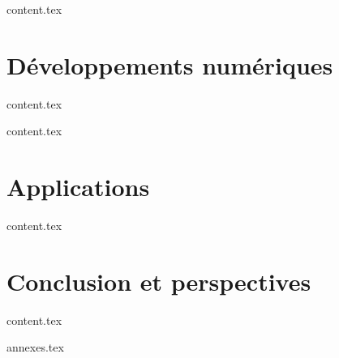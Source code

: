 \documentclass{bredele}
\begin{document}
\clearemptydoublepage
{content.tex}

\part{Développements numériques}

\clearemptydoublepage
{content.tex}


\clearemptydoublepage
{content.tex}

\part{Applications}

\clearemptydoublepage
{content.tex}


\part{Conclusion et perspectives}


\clearemptydoublepage
{content.tex}



\clearemptydoublepage
\renewcommand{\thesubsection}{\Alph{chapter}}
{annexes.tex}

\frontmatter


\clearemptydoublepage
\backmatter
\printbibliography

\tikzexternaldisable
\end{document}
